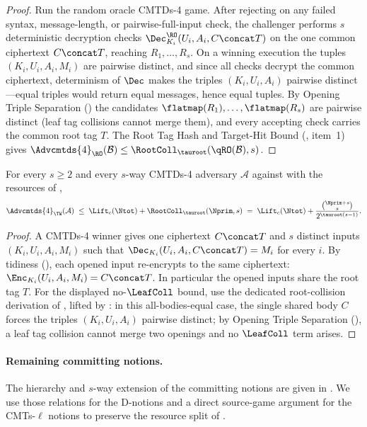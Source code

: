\begin{proof}
Run the random oracle CMTDs-4 game. After rejecting on any failed syntax,
message-length, or pairwise-full-input check, the challenger performs $s$
deterministic decryption checks $\Dec_{K_i}^\RO(U_i,A_i,C \concat T)$ on
the one common ciphertext $C \concat T$, reaching $R_1,\dots,R_s$. On a winning
execution the tuples $(K_i,U_i,A_i,M_i)$ are pairwise distinct, and since
all checks decrypt the common ciphertext, determinism of $\Dec$ makes the
triples $(K_i,U_i,A_i)$ pairwise distinct---equal triples would return
equal messages, hence equal tuples. By Opening Triple Separation
() the candidates $\flatmap(R_1),\dots,\flatmap(R_s)$
are pairwise distinct (leaf tag collisions cannot merge them), and every
accepting check carries the common root tag $T$. The Root Tag Hash and Target-Hit Bound
(, item~1) gives
$\Advcmtds{4}_\RO(\mathcal{B}) \leq \RootColl_{\tauroot}(\qRO(\mathcal{B}), s)$.
\end{proof}

\begin{corollary}
\label{cor:cmtds4}
For every $s \geq 2$ and every $s$-way CMTDs-4
adversary $\mathcal{A}$ against \TW{} with the resources of
,
\[
  \Advcmtds{4}_\TW(\mathcal{A})
  \;\leq\;
  \Lift_c(\Ntot) + \RootColl_{\tauroot}(\Nprim, s)
  \;=\;
  \Lift_c(\Ntot) + \frac{\binom{\Nprim + s}{s}}{2^{\tauroot (s - 1)}}.
\]
\end{corollary}

\begin{proof}
A CMTDs-4 winner gives one ciphertext $C \concat T$ and $s$ distinct inputs
$(K_i,U_i,A_i,M_i)$ such that
$\Dec_{K_i}(U_i,A_i,C \concat T) = M_i$ for every $i$. By \TW{} tidiness
(), each opened input re-encrypts to the same ciphertext:
$\Enc_{K_i}(U_i,A_i,M_i) = C \concat T$. In particular the opened inputs share
the root tag $T$. For the displayed no-$\LeafColl$ bound, use the dedicated
root-collision derivation of , lifted by
: in this all-bodies-equal case, the single shared
body $C$ forces the triples $(K_i,U_i,A_i)$ pairwise distinct; by Opening
Triple Separation (), a leaf tag collision cannot merge
two openings and no $\LeafColl$ term arises.
\end{proof}

\paragraph{Remaining committing notions.}
The hierarchy and $s$-way extension of the \cite{BH22} committing notions
are given in \cite[\S3, Figs.~4--5, and App.~A]{BH22}. We use those
relations for the D-notions and a direct source-game argument for the
CMTs-$\ell$ notions to preserve the resource split of
.

